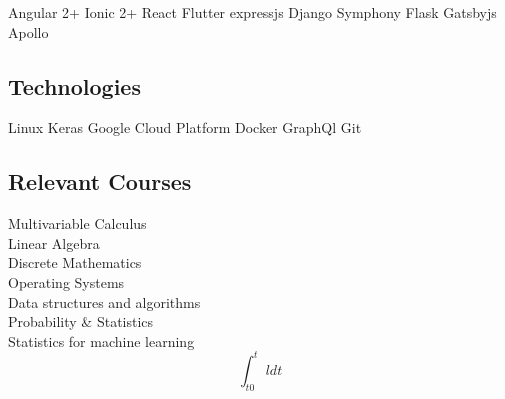 \documentclass[]{deedy-resume-openfont}
\begin{document}
\begin{minipage}[t]{0.33\textwidth}
\hfill

Angular 2+ \textbullet{} Ionic 2+ \textbullet{} React \textbullet{} Flutter \textbullet{} expressjs \textbullet{} Django \textbullet{} Symphony  \textbullet{} Flask \textbullet{} Gatsbyjs \textbullet{} \\ Apollo\\

\hfill 
\hfill 

\subsection{Technologies}
Linux \textbullet{} Keras \textbullet{} Google Cloud Platform \textbullet{} Docker \textbullet{} GraphQl \textbullet{} Git\\

\hfill 
\hfill 

\subsection{Relevant Courses}
Multivariable Calculus \\
Linear Algebra \\
Discrete Mathematics\\
Operating Systems \\
Data structures and algorithms \\
Probability \& Statistics \\
Statistics for machine learning\\
$$\int_{t0}^{t} l dt$$

%
%

\end{minipage} 
\hfill
\end{document}
